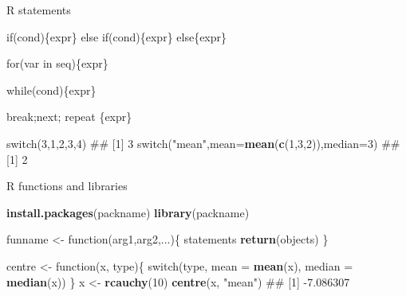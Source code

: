 \documentclass[ignorenonframetext,]{beamer}
\newenvironment{Shaded}{\begin{snugshade}}{\end{snugshade}}
\newcommand{\KeywordTok}[1]{\textcolor[rgb]{0.13,0.29,0.53}{\textbf{{#1}}}}
\newcommand{\DataTypeTok}[1]{\textcolor[rgb]{0.13,0.29,0.53}{{#1}}}
\newcommand{\DecValTok}[1]{\textcolor[rgb]{0.00,0.00,0.81}{{#1}}}
\newcommand{\StringTok}[1]{\textcolor[rgb]{0.31,0.60,0.02}{{#1}}}
\newcommand{\NormalTok}[1]{{#1}}
\begin{document}
\begin{frame}[fragile]{R statements}

\begin{Shaded}
\begin{Highlighting}[]
\NormalTok{if(cond)\{expr\}}
\NormalTok{else if(cond)\{expr\}}
\NormalTok{else\{expr\}}

\NormalTok{for(var in seq)\{expr\}}

\NormalTok{while(cond)\{expr\}}

\NormalTok{break;next;}
\NormalTok{repeat \{expr\}}
\end{Highlighting}
\end{Shaded}

\begin{Shaded}
\begin{Highlighting}[]
\NormalTok{switch(}\DecValTok{3}\NormalTok{,}\DecValTok{1}\NormalTok{,}\DecValTok{2}\NormalTok{,}\DecValTok{3}\NormalTok{,}\DecValTok{4}\NormalTok{)}
\NormalTok{## [1] 3}
\NormalTok{switch(}\StringTok{"mean"}\NormalTok{,}\DataTypeTok{mean=}\KeywordTok{mean}\NormalTok{(}\KeywordTok{c}\NormalTok{(}\DecValTok{1}\NormalTok{,}\DecValTok{3}\NormalTok{,}\DecValTok{2}\NormalTok{)),}\DataTypeTok{median=}\DecValTok{3}\NormalTok{)}
\NormalTok{## [1] 2}
\end{Highlighting}
\end{Shaded}

\end{frame}

\begin{frame}[fragile]{R functions and libraries}

\begin{Shaded}
\begin{Highlighting}[]
\KeywordTok{install.packages}\NormalTok{(packname)}
\KeywordTok{library}\NormalTok{(packname)}

\NormalTok{funname <-}\StringTok{ }\NormalTok{function(arg1,arg2,...)\{}
  \NormalTok{statements}
  \KeywordTok{return}\NormalTok{(objects)}
\NormalTok{\}}
\end{Highlighting}
\end{Shaded}

\begin{Shaded}
\begin{Highlighting}[]
\NormalTok{centre <-}\StringTok{ }\NormalTok{function(x, type)\{}
  \NormalTok{switch(type,}
         \DataTypeTok{mean =} \KeywordTok{mean}\NormalTok{(x),}
         \DataTypeTok{median =} \KeywordTok{median}\NormalTok{(x))}
\NormalTok{\}}
\NormalTok{x <-}\StringTok{ }\KeywordTok{rcauchy}\NormalTok{(}\DecValTok{10}\NormalTok{)}
\KeywordTok{centre}\NormalTok{(x, }\StringTok{"mean"}\NormalTok{)}
\NormalTok{## [1] -7.086307}
\end{Highlighting}
\end{Shaded}

\end{frame}
\end{document}
